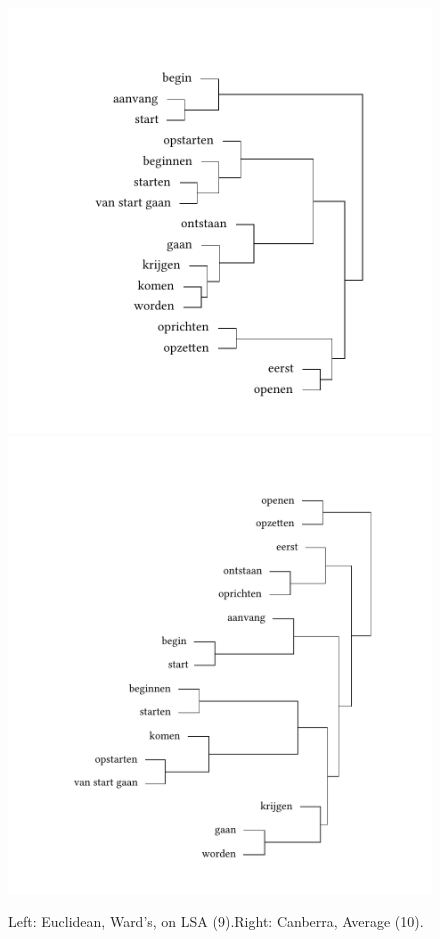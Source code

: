 \begin{figure}
\includegraphics[width=.48\textwidth,trim=100 40 75 135]{figures/tree38.pdf}\hfill%
\includegraphics[width=.48\textwidth,trim=100 40 75 135]{figures/tree39.pdf}
\caption{\label{fig:3:38}Left: Euclidean, Ward’s, on LSA (9).\label{fig:3:39}Right: Canberra, Average (10).}
\end{figure}


